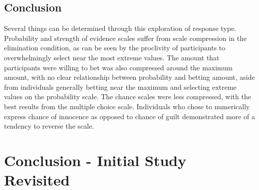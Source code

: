 \documentclass[print]{nuthesis}
\begin{document}
\begin{quote}
\end{quote}

\begin{quote}
\end{quote}


\begin{quote}
\end{quote}

\begin{quote}
\end{quote}

\hypertarget{conclusion-2}{%
\section{Conclusion}\label{conclusion-2}}

Several things can be determined through this exploration of response type.
Probability and strength of evidence scales suffer from scale compression in the elimination condition, as can be seen by the proclivity of participants to overwhelmingly select near the most extreme values.
The amount that participants were willing to bet was also compressed around the maximum amount, with no clear relationship between probability and betting amount, aside from individuals generally betting near the maximum and selecting extreme values on the probability scale.
The chance scales were less compressed, with the best results from the multiple choice scale.
Individuals who chose to numerically express chance of innocence as opposed to chance of guilt demonstrated more of a tendency to reverse the scale.

\hypertarget{finalstudy}{%
\chapter{Conclusion - Initial Study Revisited}\label{finalstudy}}
\end{document}
